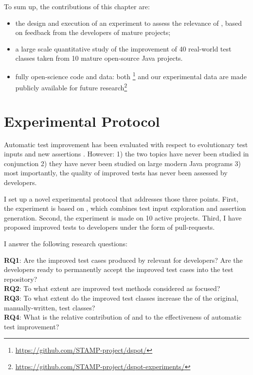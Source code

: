 To sum up, the contributions of this chapter are:
\begin{itemize}
	\item the design and execution of an experiment to assess the relevance of \dspot, based on feedback from the developers of mature projects;
	\item a large scale quantitative study of the improvement of 40 real-world test classes taken from 10 mature open-source Java projects.	
	\item fully open-science code and data: both \dspot\footnote{\url{https://github.com/STAMP-project/dspot/}} and our experimental data are made publicly available for future research\footnote{\url{https://github.com/STAMP-project/dspot-experiments/}}
\end{itemize}

\section{Experimental  Protocol}
\label{sec:test-improvement:experiment-protocol}

Automatic test improvement has been evaluated with respect to evolutionary test inputs \cite{tonella} and new assertions \cite{TaoXie2006}.
However:
1) the two topics have never been studied in conjunction
2) they have never been studied on large modern Java programs
3) most importantly, the quality of improved tests has never been assessed by developers.

I set up a novel experimental protocol that addresses those three points.
First, the experiment is based on \dspot, which combines test input exploration and assertion generation.
Second, the experiment is made on 10 active \gh projects.
Third, I have proposed improved tests to developers under the form of pull-requests.

I answer the following research questions:

\newcommand\rqpullrequest{RQ1\xspace}
\newcommand\rqcandidates{RQ2\xspace}
\newcommand\rqeffectiveness{RQ3\xspace}
\newcommand\rqAmplVersusIAmpl{RQ4\xspace}

\noindent\textbf{\rqpullrequest}: Are the improved test cases produced by \dspot relevant for developers? Are the developers ready to permanently accept the improved test cases into the test repository?\\
\textbf{\rqcandidates}: To what extent are improved test methods considered as focused?\\
\textbf{\rqeffectiveness}: To what extent do the improved test classes increase the \ms of the original,  manually-written, test classes?\\
\textbf{\rqAmplVersusIAmpl}: What is the relative contribution of \Iampl{} and \Aampl{} to the effectiveness of automatic test improvement?\\

